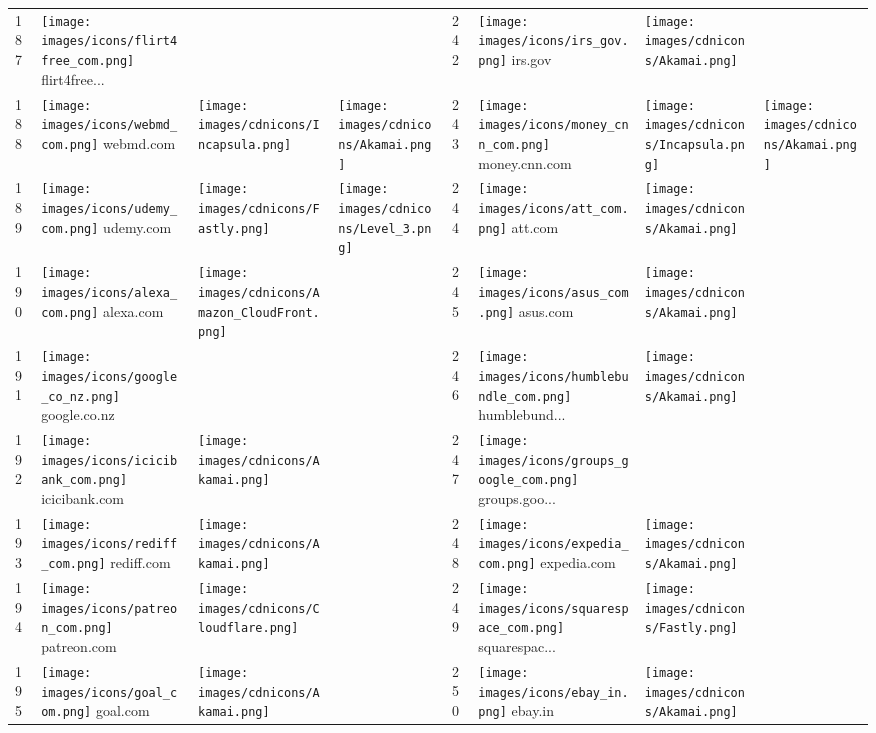 \begin{table}[tbp]
\begin{tabular}{|llll|llll|}
187 & \texttt{[image: images/icons/flirt4free\_com.png]} flirt4free... & & & 242 & \texttt{[image: images/icons/irs\_gov.png]} irs.gov & \texttt{[image: images/cdnicons/Akamai.png]} & \\
188 & \texttt{[image: images/icons/webmd\_com.png]} webmd.com & \texttt{[image: images/cdnicons/Incapsula.png]} & \texttt{[image: images/cdnicons/Akamai.png]} & 243 & \texttt{[image: images/icons/money\_cnn\_com.png]} money.cnn.com & \texttt{[image: images/cdnicons/Incapsula.png]} & \texttt{[image: images/cdnicons/Akamai.png]} \\
189 & \texttt{[image: images/icons/udemy\_com.png]} udemy.com & \texttt{[image: images/cdnicons/Fastly.png]} & \texttt{[image: images/cdnicons/Level\_3.png]} & 244 & \texttt{[image: images/icons/att\_com.png]} att.com & \texttt{[image: images/cdnicons/Akamai.png]} & \\
190 & \texttt{[image: images/icons/alexa\_com.png]} alexa.com & \texttt{[image: images/cdnicons/Amazon\_CloudFront.png]} & & 245 & \texttt{[image: images/icons/asus\_com.png]} asus.com & \texttt{[image: images/cdnicons/Akamai.png]} & \\
191 & \texttt{[image: images/icons/google\_co\_nz.png]} google.co.nz & & & 246 & \texttt{[image: images/icons/humblebundle\_com.png]} humblebund... & \texttt{[image: images/cdnicons/Akamai.png]} & \\
192 & \texttt{[image: images/icons/icicibank\_com.png]} icicibank.com & \texttt{[image: images/cdnicons/Akamai.png]} & & 247 & \texttt{[image: images/icons/groups\_google\_com.png]} groups.goo... & & \\
193 & \texttt{[image: images/icons/rediff\_com.png]} rediff.com & \texttt{[image: images/cdnicons/Akamai.png]} & & 248 & \texttt{[image: images/icons/expedia\_com.png]} expedia.com & \texttt{[image: images/cdnicons/Akamai.png]} & \\
194 & \texttt{[image: images/icons/patreon\_com.png]} patreon.com & \texttt{[image: images/cdnicons/Cloudflare.png]} & & 249 & \texttt{[image: images/icons/squarespace\_com.png]} squarespac... & \texttt{[image: images/cdnicons/Fastly.png]} & \\
195 & \texttt{[image: images/icons/goal\_com.png]} goal.com & \texttt{[image: images/cdnicons/Akamai.png]} & & 250 & \texttt{[image: images/icons/ebay\_in.png]} ebay.in & \texttt{[image: images/cdnicons/Akamai.png]} & \\

\end{tabular}
\end{table}
